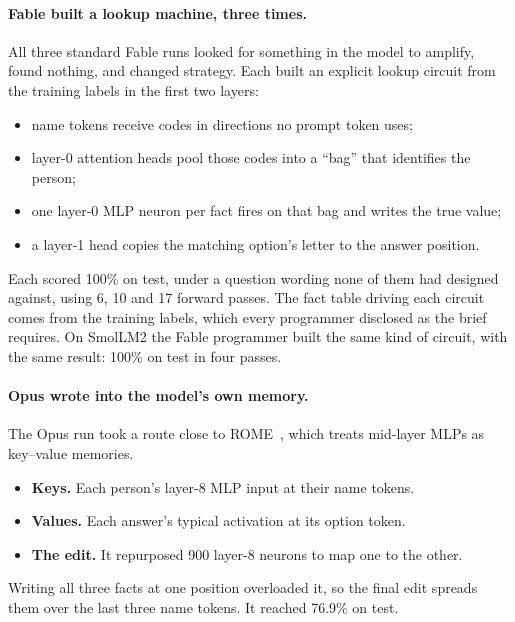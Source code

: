 \paragraph{Fable built a lookup machine, three times.} All three standard Fable runs looked for something in the model to amplify, found nothing, and changed strategy. Each built an explicit lookup circuit from the training labels in the first two layers:
\begin{itemize}
  \item name tokens receive codes in directions no prompt token uses;
  \item layer-0 attention heads pool those codes into a ``bag'' that identifies the person;
  \item one layer-0 MLP neuron per fact fires on that bag and writes the true value;
  \item a layer-1 head copies the matching option's letter to the answer position.
\end{itemize}
Each scored 100\% on test, under a question wording none of them had designed against, using 6, 10 and 17 forward passes. The fact table driving each circuit comes from the training labels, which every programmer disclosed as the brief requires. On SmolLM2 the Fable programmer built the same kind of circuit, with the same result: 100\% on test in four passes.

\paragraph{Opus wrote into the model's own memory.} The Opus run took a route close to ROME~\citep{meng2022rome}, which treats mid-layer MLPs as key--value memories.
\begin{itemize}
  \item \textbf{Keys.} Each person's layer-8 MLP input at their name tokens.
  \item \textbf{Values.} Each answer's typical activation at its option token.
  \item \textbf{The edit.} It repurposed 900 layer-8 neurons to map one to the other.
\end{itemize}
Writing all three facts at one position overloaded it, so the final edit spreads them over the last three name tokens. It reached 76.9\% on test.

